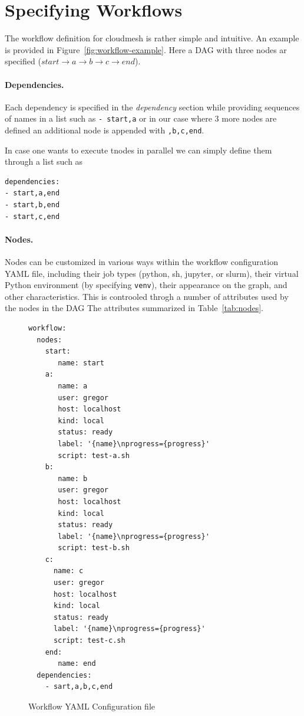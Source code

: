 
\section{Specifying Workflows}\label{specifying-workflows}

The workflow definition for cloudmesh is rather simple and intuitive.
An example is provided in Figure~\ref{fig:workflow-example}.  Here a
DAG with three nodes ar specified ($start \rightarrow a \rightarrow b \rightarrow c \rightarrow end $).

\paragraph{Dependencies.}
Each dependency is specified in the {\em dependency} section while
providing sequences of names in a list such as \verb|- start,a| or in our
case where 3 more nodes are defined an additional node is appended
with \verb|,b,c,end|.

In case one wants to execute tnodes in parallel we can simply define them through a list such as

\begin{verbatim}
dependencies:
- start,a,end
- start,b,end
- start,c,end
\end{verbatim}

\paragraph{Nodes.}
Nodes can be customized in various ways within the workflow
configuration YAML file, including their job types (python, sh, jupyter,
or slurm), their virtual Python environment (by specifying
\texttt{venv}), their appearance on the graph, and other
characteristics.
This is controoled throgh a number of attributes used by the nodes in the DAG
The attributes summarized in Table~\ref{tab:nodes}.


\begin{figure}
\begin{verbatim}
workflow:
  nodes:
    start:
       name: start
    a:
       name: a
       user: gregor
       host: localhost
       kind: local
       status: ready
       label: '{name}\nprogress={progress}'
       script: test-a.sh
    b:
       name: b
       user: gregor
       host: localhost
       kind: local
       status: ready
       label: '{name}\nprogress={progress}'
       script: test-b.sh
    c:
      name: c
      user: gregor
      host: localhost
      kind: local
      status: ready
      label: '{name}\nprogress={progress}'
      script: test-c.sh
    end:
       name: end
  dependencies:
    - sart,a,b,c,end
\end{verbatim}
\caption{Workflow YAML Configuration file}\label{fig:workflow-example}
\label{fig:yaml-file}
\end{figure}

